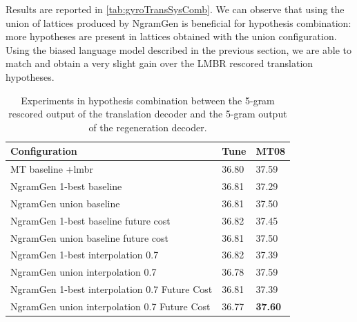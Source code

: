 Results are reported in \autoref{tab:gyroTransSysComb}.
We can observe that using the union of lattices produced
by NgramGen is beneficial for hypothesis combination: more hypotheses
are present in lattices obtained with the union configuration.
Using the biased language model described in the
previous section, we are able to match and obtain
a very slight gain over the LMBR rescored translation
hypotheses.
\begin{table}
  \begin{center}
    \begin{tabular}{l|l|l}
      Configuration & Tune & MT08 \\
      \hline
      MT baseline +lmbr & 36.80 & 37.59 \\
      \hline
      NgramGen 1-best baseline &  36.81 & 37.29 \\
      NgramGen union baseline & 36.81 & 37.50 \\
      \hline
      NgramGen 1-best baseline future cost & 36.82 & 37.45 \\
      NgramGen union baseline future cost & 36.81 & 37.50 \\
      \hline
      NgramGen 1-best interpolation 0.7 & 36.82 & 37.39 \\
      NgramGen union interpolation 0.7 & 36.78 & 37.59 \\
      \hline
      NgramGen 1-best interpolation 0.7 Future Cost & 36.81 & 37.39 \\
      NgramGen union interpolation 0.7 Future Cost & 36.77 & \textbf{37.60} \\
    \end{tabular}
    \caption{Experiments in hypothesis combination between the 5-gram rescored
      output of the translation
      decoder and the 5-gram output of the regeneration decoder.}
    \label{tab:gyroTransSysComb}
  \end{center}
\end{table}



